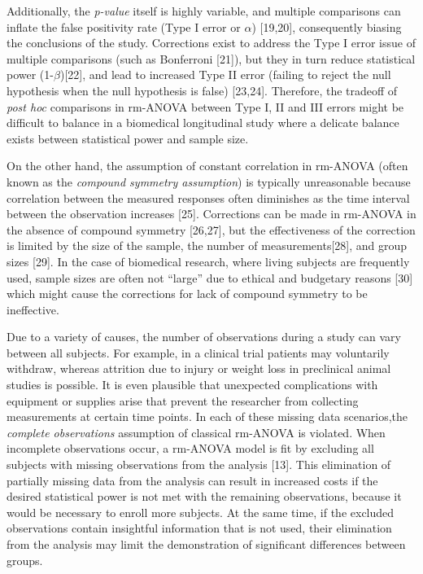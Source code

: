 \documentclass[
]{article}
\begin{document}
Additionally, the \emph{p-value} itself is highly variable, and multiple comparisons can inflate the false positivity rate (Type I error or \(\alpha\)) {[}19,20{]}, consequently biasing the conclusions of the study. Corrections exist to address the Type I error issue of multiple comparisons (such as Bonferroni {[}21{]}), but they in turn reduce statistical power (1-\(\beta\)){[}22{]}, and lead to increased Type II error (failing to reject the null hypothesis when the null hypothesis is false) {[}23,24{]}. Therefore, the tradeoff of \emph{post hoc} comparisons in rm-ANOVA between Type I, II and III errors might be difficult to balance in a biomedical longitudinal study where a delicate balance exists between statistical power and sample size.

On the other hand, the assumption of constant correlation in rm-ANOVA (often known as the \emph{compound symmetry assumption}) is typically unreasonable because correlation between the measured responses often diminishes as the time interval between the observation increases {[}25{]}. Corrections can be made in rm-ANOVA in the absence of compound symmetry {[}26,27{]}, but the effectiveness of the correction is limited by the size of the sample, the number of measurements{[}28{]}, and group sizes {[}29{]}. In the case of biomedical research, where living subjects are frequently used, sample sizes are often not ``large'' due to ethical and budgetary reasons {[}30{]} which might cause the corrections for lack of compound symmetry to be ineffective.

Due to a variety of causes, the number of observations during a study can vary between all subjects. For example, in a clinical trial patients may voluntarily withdraw, whereas attrition due to injury or weight loss in preclinical animal studies is possible. It is even plausible that unexpected complications with equipment or supplies arise that prevent the researcher from collecting measurements at certain time points. In each of these missing data scenarios,the \emph{complete observations} assumption of classical rm-ANOVA is violated. When incomplete observations occur, a rm-ANOVA model is fit by excluding all subjects with missing observations from the analysis {[}13{]}. This elimination of partially missing data from the analysis can result in increased costs if the desired statistical power is not met with the remaining observations, because it would be necessary to enroll more subjects. At the same time, if the excluded observations contain insightful information that is not used, their elimination from the analysis may limit the demonstration of significant differences between groups.
\end{document}
